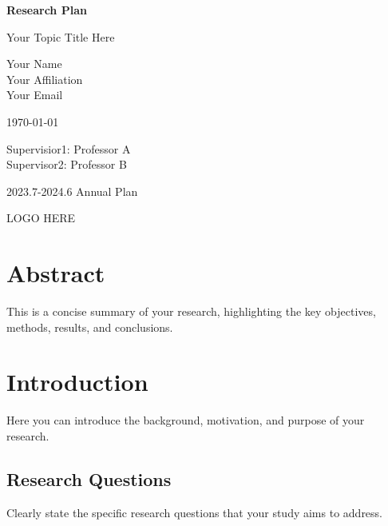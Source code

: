 \documentclass{article}
\newcommand\supervisorinfo{
    Supervisior1: Professor A \\
    Supervisor2: Professor B
}
\newcommand\authorinfo{
    Your Name \\ 
    Your Affiliation \\ 
    Your Email
}
\begin{document}
\pagestyle{fancy}
\fancyhead[L]{\leftmark}

\begin{titlepage}
    \begin{center}
        \vspace*{3cm}
            
        \Huge
        \textbf{Research Plan}
            
        \vspace{1cm}
        \huge
        Your Topic Title Here
        
        
            
        \vspace{1.5cm}
        \Large
        
        \authorinfo
        
        \today
        
            
        \vfill
        
        \supervisorinfo
        
        2023.7-2024.6 Annual Plan
            
        \vspace{1cm}
        
       	LOGO HERE
        
        \Large
            
    \end{center}
\end{titlepage}


\newpage

\tableofcontents

\newpage

\section*{Abstract}
This is a concise summary of your research, highlighting the key objectives, methods, results, and conclusions.

\section{Introduction}
Here you can introduce the background, motivation, and purpose of your research.

\subsection{Research Questions}
Clearly state the specific research questions that your study aims to address.
\end{document}
